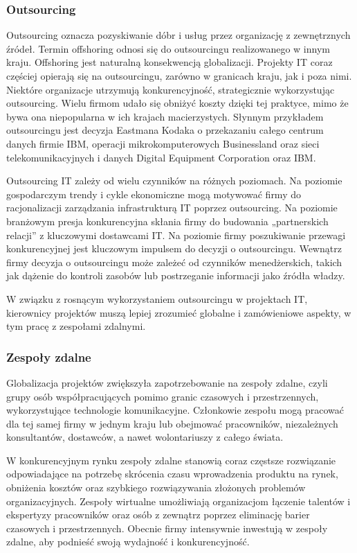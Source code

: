 \subsubsection{Outsourcing}
Outsourcing oznacza pozyskiwanie dóbr i usług przez organizację z zewnętrznych źródeł. Termin offshoring odnosi się do outsourcingu realizowanego w innym kraju. Offshoring jest naturalną konsekwencją globalizacji. Projekty IT coraz częściej opierają się na outsourcingu, zarówno w granicach kraju, jak i poza nimi.
Niektóre organizacje utrzymują konkurencyjność, strategicznie wykorzystując outsourcing. Wielu firmom udało się obniżyć koszty dzięki tej praktyce, mimo że bywa ona niepopularna w ich krajach macierzystych.\autocite{ITPM}
Słynnym przykładem outsourcingu jest decyzja Eastmana Kodaka o przekazaniu całego centrum danych firmie IBM, operacji mikrokomputerowych Businessland oraz sieci telekomunikacyjnych i danych Digital Equipment Corporation oraz IBM.

Outsourcing IT zależy od wielu czynników na różnych poziomach. Na poziomie gospodarczym trendy i cykle ekonomiczne mogą motywować firmy do racjonalizacji zarządzania infrastrukturą IT poprzez outsourcing. Na poziomie branżowym presja konkurencyjna skłania firmy do budowania „partnerskich relacji” z kluczowymi dostawcami IT. Na poziomie firmy poszukiwanie przewagi konkurencyjnej jest kluczowym impulsem do decyzji o outsourcingu. Wewnątrz firmy decyzja o outsourcingu może zależeć od czynników menedżerskich, takich jak dążenie do kontroli zasobów lub postrzeganie informacji jako źródła władzy.\autocite{loh1992determinants}\autocite{Kanter1979}\autocite{Mintzberg1983}
 
W związku z rosnącym wykorzystaniem outsourcingu w projektach IT, kierownicy projektów muszą lepiej zrozumieć globalne i zamówieniowe aspekty, w tym pracę z zespołami zdalnymi.\autocite{ITPM}  

\subsubsection{Zespoły zdalne}
Globalizacja projektów zwiększyła zapotrzebowanie na zespoły zdalne,\autocite{pmbok6} czyli grupy osób współpracujących pomimo granic czasowych i przestrzennych, wykorzystujące technologie komunikacyjne. Członkowie zespołu mogą pracować dla tej samej firmy w jednym kraju lub obejmować pracowników, niezależnych konsultantów, dostawców, a nawet wolontariuszy z całego świata.\autocite{ITPM}

W konkurencyjnym rynku zespoły zdalne stanowią coraz częstsze rozwiązanie odpowiadające na potrzebę skrócenia czasu wprowadzenia produktu na rynek, obniżenia kosztów oraz szybkiego rozwiązywania złożonych problemów organizacyjnych. Zespoły wirtualne umożliwiają organizacjom łączenie talentów i ekspertyzy pracowników oraz osób z zewnątrz poprzez eliminację barier czasowych i przestrzennych. Obecnie firmy intensywnie inwestują w zespoły zdalne, aby podnieść swoją wydajność i konkurencyjność.\autocite{ebrahim2009virtual}

